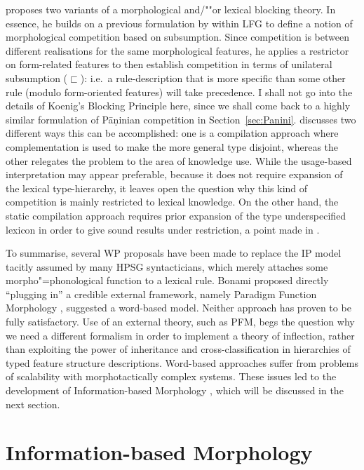 \documentclass[output=paper
	        ,collection
	        ,collectionchapter
 	        ,biblatex
                ,babelshorthands
                ,newtxmath
                ,draftmode
                ,colorlinks, citecolor=brown
]{langscibook}
\begin{document}
\begin{exe}
\begin{xlist}
\citet{Koenig99} proposes two variants of a morphological and/""or
lexical blocking theory. In essence, he builds on a previous
formulation by \citet{Andrews90} within LFG to define a notion of
morphological competition based on subsumption. Since competition is
between different realisations for the same morphological features, he
applies a restrictor on form-related features to then establish
competition in terms of unilateral subsumption ($\sqsubset$): i.e.\ a
rule-description that is more specific than some other rule (modulo
form-oriented features) will take precedence. I shall not go into the
details of Koenig's Blocking Principle here, since we shall come back
to a highly similar formulation of Pāṇinian competition in
Section~\ref{sec:Panini}.  \citet{Koenig99} discusses two different
ways this can be accomplished: one is a compilation approach where
complementation is used to make the more general type disjoint,
whereas the other relegates the problem to the area of knowledge
use. While the usage-based interpretation may appear preferable,
because it does not require expansion of the lexical type-hierarchy,
it leaves open the question why this kind of competition is mainly
restricted to lexical knowledge. On the other hand, the static
compilation approach requires prior expansion of the type
underspecified lexicon in order to give sound results under
restriction, a point made in \citet{crysmann_b03book}.

To summarise, several WP proposals have been made to
replace the IP model tacitly assumed by many HPSG syntacticians, which
merely attaches some morpho"=phonological function to a lexical rule.
Bonami \citep{Bonami08f,Bonami06,Bonami07e,Bonami11f} proposed 
directly ``plugging in'' a credible external framework, namely Paradigm
Function Morphology \citep{Stump01}, \citet{Koenig99} suggested a
word-based model. Neither approach has proven to be fully
satisfactory. Use of an external theory, such as PFM, begs
the question why we need a different formalism in order to implement a
theory of inflection, rather than exploiting the power of inheritance and
cross-classification in hierarchies of typed feature structure
descriptions. Word-based approaches suffer from problems of
scalability with morphotactically complex systems.  These issues led
to the development of Information-based Morphology
\citep{Crysmann:Bonami:2016}, which will be discussed in the next
section.


\section{Information-based Morphology}
\label{sec:IbM}


\end{xlist}
\end{exe}
\end{document}
